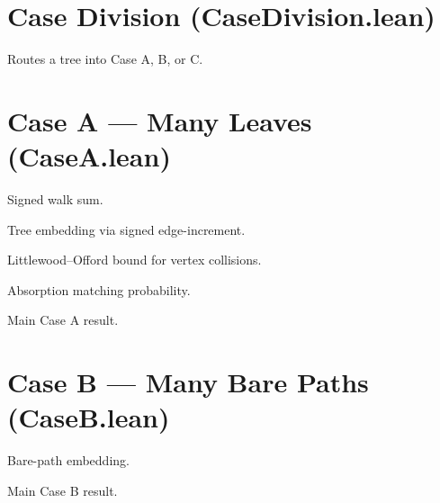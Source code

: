 \chapter{Case Division (CaseDivision.lean)}
\begin{theorem}\label{thm:case_division}
\leanok
{}
Routes a tree into Case A, B, or C.
\end{theorem}

\chapter{Case A --- Many Leaves (CaseA.lean)}
\begin{definition}\label{def:walkSum}
\leanok
Signed walk sum.
\end{definition}

\begin{lemma}\label{lem:tree_embed}
\leanok
Tree embedding via signed edge-increment.
\end{lemma}

\begin{lemma}\label{lem:bound_vertex_collisions}
Littlewood--Offord bound for vertex collisions.
\end{lemma}

\begin{lemma}\label{lem:exists_absorption_matching}
Absorption matching probability.
\end{lemma}

\begin{theorem}\label{thm:caseA_rainbow}
Main Case A result.
\end{theorem}

\chapter{Case B --- Many Bare Paths (CaseB.lean)}
\begin{lemma}\label{lem:caseB_embedding_exists}
Bare-path embedding.
\end{lemma}

\begin{theorem}\label{thm:caseB_rainbow}
Main Case B result.
\end{theorem}

